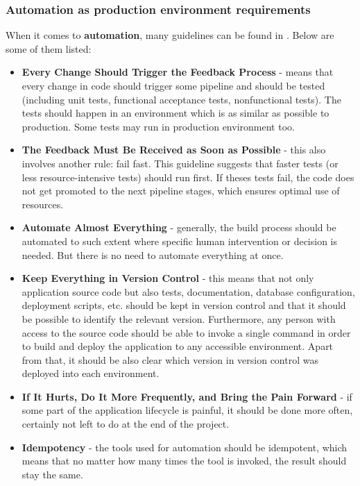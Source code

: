 \subsubsection{Automation as production environment requirements}
\label{Automation as production environment requirements}
When it comes to \textbf{automation}, many guidelines can be found in \cite{book-cicd}. Below are some of them listed:
\begin{itemize}
\item \textbf{Every Change Should Trigger the Feedback Process} - means that every change in code should trigger some pipeline and should be tested (including unit tests, functional acceptance tests, nonfunctional tests). The tests should happen in an environment which is as similar as possible to production. Some tests may run in production environment too\cite{book-cicd}\cite{book-iac}.
\item \textbf{The Feedback Must Be Received as Soon as Possible} - this also involves another rule: fail fast. This guideline suggests that faster tests (or less resource-intensive tests) should run first. If theses tests fail, the code does not get promoted to the next pipeline stages, which ensures optimal use of resources\cite{book-cicd}.
\item \textbf{Automate Almost Everything} - generally, the build process should be automated to such extent where specific human intervention or decision is needed. But there is no need to automate everything at once\cite{book-cicd}\cite{book-iac}.
\item \textbf{Keep Everything in Version Control} - this means that not only application source code but also tests, documentation, database configuration, deployment scripts, etc. should be kept in version control and that it should be possible to identify the relevant version. Furthermore, any person with access to the source code should be able to invoke a single command in order to build and deploy the application to any accessible environment. Apart from that, it should be also clear which version in version control was deployed into each environment\cite{book-cicd}.
\item \textbf{If It Hurts, Do It More Frequently, and Bring the Pain Forward} - if some part of the application lifecycle is painful, it should be done more often, certainly not left to do at the end of the project\cite{book-cicd}.
\item \textbf{Idempotency} - the tools used for automation should be idempotent, which means that no matter how many times the tool is invoked, the result should stay the same\cite{book-iac}.
\end{itemize}

